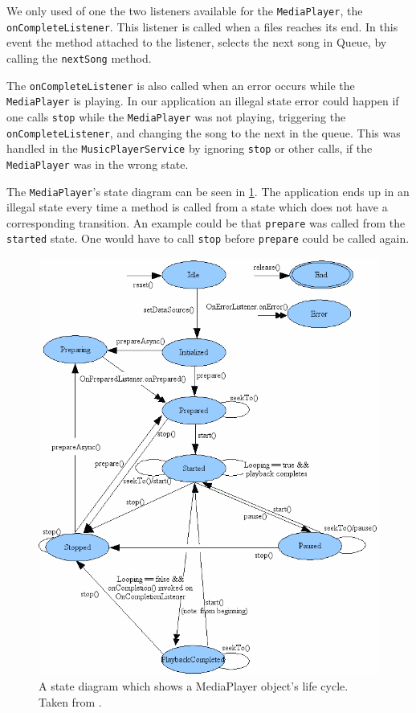 We only used of one the two listeners available for the \texttt{MediaPlayer}, the \texttt{onCompleteListener}. This listener is called when a files reaches its end. In this event the method attached to the listener, selects the next song in Queue, by calling the \texttt{nextSong} method. 

The \texttt{onCompleteListener} is also called when an error occurs while the \texttt{MediaPlayer} is playing. In our application an illegal state error could happen if one calls \texttt{stop} while the \texttt{MediaPlayer} was not playing, triggering the \texttt{onCompleteListener}, and changing the song to the next in the queue. This was handled in the \texttt{MusicPlayerService} by ignoring \texttt{stop} or other calls, if the \texttt{MediaPlayer} was in the wrong state. 

The \texttt{MediaPlayer}'s state diagram can be seen in \cref{fig:medaiPlayerState}. The application ends up in an illegal state every time a method is called from a state which does not have a corresponding transition. An example could be that \texttt{prepare} was called from the \texttt{started} state. One would have to call \texttt{stop} before \texttt{prepare} could be called again.

\begin{figure}[h!]
  \centering
    \includegraphics[scale=.33]{Images/mediaplayerStateDiagram.png}
  \caption{A state diagram which shows a MediaPlayer object's life cycle. Taken from \citet{android:MediaPlayer}.}
  \label{fig:medaiPlayerState}
\end{figure}
